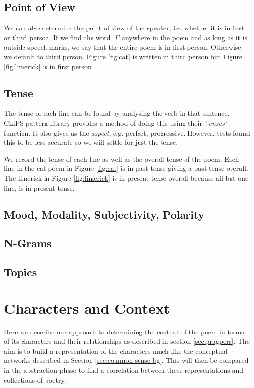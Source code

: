 \subsection{Point of View}

We can also determine the point of view of the speaker, i.e. whether it is in first or third person. If we find the word \textit{'I'} anywhere in the poem and as long as it is outside speech marks, we say that the entire poem is in first person. Otherwise we default to third person. Figure \ref{fig:cat} is written in third person but Figure \ref{fig:limerick} is in first person.

\subsection{Tense}

The tense of each line can be found by analysing the verb in that sentence. CLiPS pattern library provides a method of doing this using their \textit{'tenses'} function. It also gives us the \textit{aspect}, e.g. perfect, progressive. However, tests found this to be less accurate so we will settle for just the tense.

We record the tense of each line as well as the overall tense of the poem. Each line in the cat poem in Figure \ref{fig:cat} is in past tense giving a past tense overall. The limerick in Figure \ref{fig:limerick} is in present tense overall because all but one line, is in present tense. 


\subsection{Mood, Modality, Subjectivity, Polarity}


\subsection{N-Grams}


\subsection{Topics}


\section{Characters and Context}
\label{sec:chars}
Here we describe our approach to determining the context of the poem in terms of its characters and their relationships as described in section \ref{sec:pragpers}. The aim is to build a representation of the characters much like the conceptual networks described in Section \ref{sec:common-sense-bg}. This will then be compared in the abstraction phase to find a correlation between these representations and collections of poetry.

